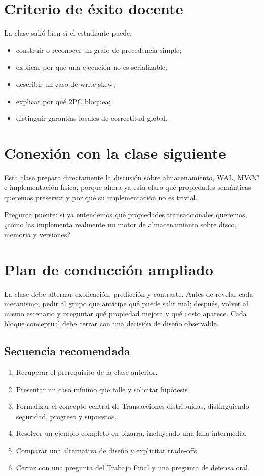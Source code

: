 \documentclass[variant=docente,cover=institutional,mode=screen]{ua-engineering-v6-article}
\begin{document}
\section{Criterio de éxito docente}

La clase salió bien si el estudiante puede:

\begin{itemize}
\item construir o reconocer un grafo de precedencia simple;
\item explicar por qué una ejecución no es serializable;
\item describir un caso de write skew;
\item explicar por qué 2PC bloquea;
\item distinguir garantías locales de correctitud global.
\end{itemize}

\section{Conexión con la clase siguiente}

Esta clase prepara directamente la discusión sobre almacenamiento, WAL, MVCC e implementación física, porque ahora ya está claro qué propiedades semánticas queremos preservar y por qué su implementación no es trivial.

\begin{uakeybox}
Pregunta puente: si ya entendemos qué propiedades transaccionales queremos, ¿cómo las implementa realmente un motor de almacenamiento sobre disco, memoria y versiones?
\end{uakeybox}


\section{Plan de conducción ampliado}
La clase debe alternar explicación, predicción y contraste. Antes de revelar cada mecanismo, pedir al grupo que anticipe qué puede salir mal; después, volver al mismo escenario y preguntar qué propiedad mejora y qué costo aparece. Cada bloque conceptual debe cerrar con una decisión de diseño observable.
\subsection*{Secuencia recomendada}
\begin{enumerate}
\item Recuperar el prerequisito de la clase anterior.
\item Presentar un caso mínimo que falle y solicitar hipótesis.
\item Formalizar el concepto central de Transacciones distribuidas, distinguiendo seguridad, progreso y supuestos.
\item Resolver un ejemplo completo en pizarra, incluyendo una falla intermedia.
\item Comparar una alternativa de diseño y explicitar trade-offs.
\item Cerrar con una pregunta del Trabajo Final y una pregunta de defensa oral.
\end{enumerate}
\end{document}
